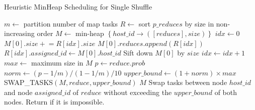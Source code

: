 \noindent
\begin{minipage}{0.95\columnwidth}
\begin{algorithm}[H]
\caption{Heuristic MinHeap Scheduling for Single Shuffle}
\label{hminheap}
	\begin{algorithmic}[1]
	\small
		\State $m\gets$ partition number of map tasks
		\State $R\gets$ sort $p\_reduces$ by size in non-increasing order
		\State $M\gets$ min-heap $\left\{ host\_id \rightarrow \left( \left[ reduces \right], size \right) \right\}$
		\State $idx\gets 0$
		\State $M\left[0\right].size \mathrel{+}= R\left[idx\right].size$
		\State $M\left[0\right].reduces.append\left(R\left[idx\right]\right)$
		\State $R\left[idx\right].assigned\_id \gets M \left[0\right].host\_id$
		\State Sift down $M\left[0\right]$ by $size$
		\State $idx\gets idx+1$
		\EndWhile
		\State $max\gets$ maximum size in $M$
				\State $p\gets reduce.prob$
				\State $norm\gets \left(p-1/m\right)/\left(1-1/m\right)/10$
				\State $upper\_bound \gets \left(1 + norm\right) \times max$
				\State SWAP\_TASKS$\left(M, reduce, upper\_bound\right)$
			\EndIf
		\EndFor
		\Return $M$
	\EndProcedure
		\State Swap tasks between node $host\_id$ and node $assigned\_id$
		\State of $reduce$ without exceeding the $upper\_bound$
		\State of both nodes.
		\State Return if it is impossible.
	\EndProcedure
	\end{algorithmic}
\end{algorithm}
\end{minipage}

